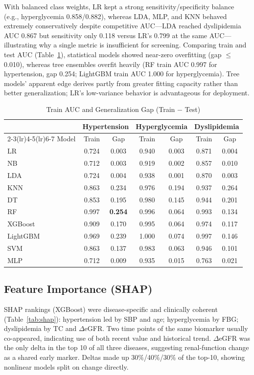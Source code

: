 \documentclass[journal]{IEEEtran}
\begin{document}
With balanced class weights, LR kept a strong sensitivity/specificity balance (e.g., hyperglycemia 0.858/0.882), whereas LDA, MLP, and KNN behaved extremely conservatively despite competitive AUC---LDA reached dyslipidemia AUC 0.867 but sensitivity only 0.118 versus LR's 0.799 at the same AUC---illustrating why a single metric is insufficient for screening. Comparing train and test AUC (Table~\ref{tab:gap}), statistical models showed near-zero overfitting (gap $\leq$0.010), whereas tree ensembles overfit heavily (RF train AUC 0.997 for hypertension, gap 0.254; LightGBM train AUC 1.000 for hyperglycemia). Tree models' apparent edge derives partly from greater fitting capacity rather than better generalization; LR's low-variance behavior is advantageous for deployment.

\begin{table}[!t]
\caption{Train AUC and Generalization Gap (Train $-$ Test)}
\label{tab:gap}
\centering
\begin{tabular}{@{}lcccccc@{}}
\toprule
& \multicolumn{2}{c}{Hypertension} & \multicolumn{2}{c}{Hyperglycemia} & \multicolumn{2}{c}{Dyslipidemia} \\
\cmidrule(lr){2-3}\cmidrule(lr){4-5}\cmidrule(lr){6-7}
Model & Train & Gap & Train & Gap & Train & Gap \\
\midrule
LR & 0.724 & 0.003 & 0.940 & 0.003 & 0.871 & 0.004 \\
NB & 0.712 & 0.003 & 0.919 & 0.002 & 0.857 & 0.010 \\
LDA & 0.724 & 0.004 & 0.938 & 0.001 & 0.870 & 0.003 \\
KNN & 0.863 & 0.234 & 0.976 & 0.194 & 0.937 & 0.264 \\
DT & 0.853 & 0.195 & 0.980 & 0.145 & 0.944 & 0.201 \\
RF & 0.997 & \textbf{0.254} & 0.996 & 0.064 & 0.993 & 0.134 \\
XGBoost & 0.909 & 0.170 & 0.995 & 0.064 & 0.974 & 0.117 \\
LightGBM & 0.969 & 0.239 & 1.000 & 0.074 & 0.997 & 0.146 \\
SVM & 0.863 & 0.137 & 0.983 & 0.063 & 0.946 & 0.101 \\
MLP & 0.712 & 0.009 & 0.935 & 0.015 & 0.763 & 0.021 \\
\bottomrule
\end{tabular}
\end{table}

\subsection{Feature Importance (SHAP)}
SHAP rankings (XGBoost) were disease-specific and clinically coherent (Table~\ref{tab:shap}): hypertension led by SBP and age; hyperglycemia by FBG; dyslipidemia by TC and $\Delta$eGFR. Two time points of the same biomarker usually co-appeared, indicating use of both recent value and historical trend. $\Delta$eGFR was the only delta in the top 10 of all three diseases, suggesting renal-function change as a shared early marker. Deltas made up 30\%/40\%/30\% of the top-10, showing nonlinear models split on change directly.
\end{document}
